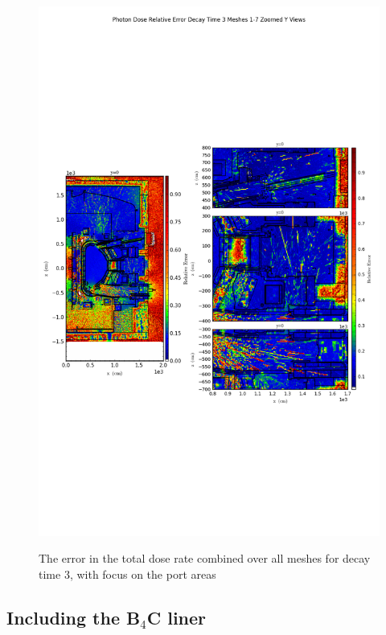 \documentclass[12pt]{article}
\begin{document}
\begin{figure}[ht!]
\centering
\includegraphics[trim={0cm 9cm 0cm 10cm},clip,scale=0.75]{../plots/final_model_nob4c/Photon_Dose_Relative_Error_Decay_Time_3_Meshes_1-7_Zoomed_Y_Views.png}
\label{fig:photons_dc3_no4bc_total_error_zoomed}
\caption{The error in the total dose rate combined over all meshes for decay time 3, with focus on the port areas}
\end{figure}
\clearpage
\subsection{Including the B$_4$C liner}
\end{document}
